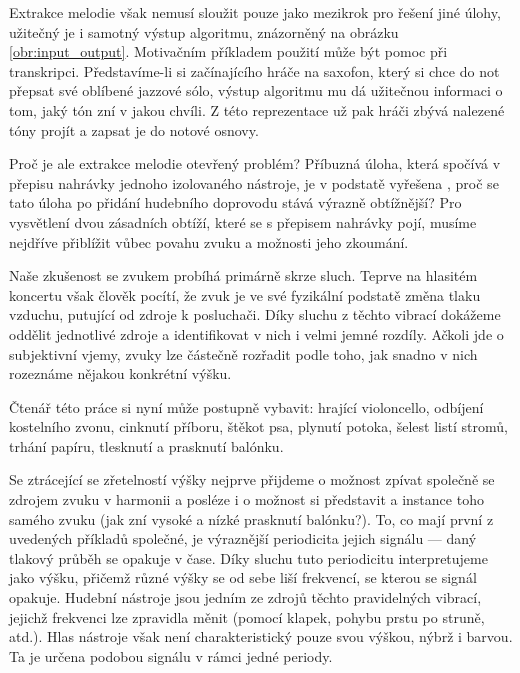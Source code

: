 Extrakce melodie však nemusí sloužit pouze jako mezikrok pro řešení jiné úlohy, užitečný je i samotný výstup algoritmu, znázorněný na obrázku \ref{obr:input_output}. Motivačním příkladem použití může být pomoc při transkripci. Představíme-li si začínajícího hráče na saxofon, který si chce do not přepsat své oblíbené jazzové sólo, výstup algoritmu mu dá užitečnou informaci o tom, jaký tón zní v jakou chvíli. Z této reprezentace už pak hráči zbývá nalezené tóny projít a zapsat je do notové osnovy.

Proč je ale extrakce melodie otevřený problém? Příbuzná úloha, která spočívá v přepisu nahrávky jednoho izolovaného nástroje, je v podstatě vyřešena \citep{Mauch2014a}, proč se tato úloha po přidání hudebního doprovodu stává výrazně obtížnější? Pro vysvětlení dvou zásadních obtíží, které se s přepisem nahrávky pojí, musíme nejdříve přiblížit vůbec povahu zvuku a možnosti jeho zkoumání.


Naše zkušenost se zvukem probíhá primárně skrze sluch. Teprve na hlasitém koncertu však člověk pocítí, že zvuk je ve své fyzikální podstatě změna tlaku vzduchu, putující od zdroje k posluchači. Díky sluchu z těchto vibrací dokážeme oddělit jednotlivé zdroje a identifikovat v nich i velmi jemné rozdíly. Ačkoli jde o subjektivní vjemy, zvuky lze částečně rozřadit podle toho, jak snadno v nich rozeznáme nějakou konkrétní výšku. 

\vspace*{0.5cm}

Čtenář této práce si nyní může postupně vybavit: hrající violoncello, odbíjení kostelního zvonu, cinknutí příboru, štěkot psa, plynutí potoka, šelest listí stromů, trhání papíru, tlesknutí a prasknutí balónku.

\vspace*{0.5cm}

Se ztrácející se zřetelností výšky nejprve přijdeme o možnost zpívat společně se zdrojem zvuku v harmonii a posléze i o možnost si představit  a  instance toho samého zvuku (jak zní vysoké a nízké prasknutí balónku?). To, co mají první z uvedených příkladů společné, je výraznější periodicita jejich signálu --- daný tlakový průběh se opakuje v čase. Díky sluchu tuto periodicitu interpretujeme jako výšku, přičemž různé výšky se od sebe liší frekvencí, se kterou se signál opakuje. Hudební nástroje jsou jedním ze zdrojů těchto pravidelných vibrací, jejichž frekvenci lze zpravidla měnit (pomocí klapek, pohybu prstu po struně, atd.). Hlas nástroje však není charakteristický pouze svou výškou, nýbrž i barvou. Ta je určena podobou signálu v rámci jedné periody. 

